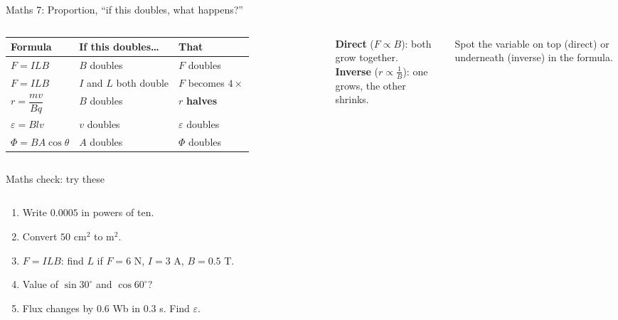 \documentclass[aspectratio=169,11pt,xcolor=table]{beamer}
\begin{document}
\begin{frame}{Maths 7: Proportion, ``if this doubles, what happens?''}
\begin{columns}[T]
\renewcommand{\arraystretch}{1.3}\small
\begin{tabular}{@{}lll@{}}
\toprule
\textbf{Formula} & \textbf{If this doubles\ldots} & \textbf{That}\\
\midrule
$F=ILB$ & $B$ doubles & $F$ doubles\\
$F=ILB$ & $I$ and $L$ both double & $F$ becomes $4\times$\\
$r=\dfrac{mv}{Bq}$ & $B$ doubles & $r$ \textbf{halves}\\
$\varepsilon=Blv$ & $v$ doubles & $\varepsilon$ doubles\\
$\Phi=BA\cos\theta$ & $A$ doubles & $\Phi$ doubles\\
\bottomrule
\end{tabular}
\begin{simple}
\textbf{Direct} ($F\propto B$): both grow together.\\
\textbf{Inverse} ($r\propto\frac{1}{B}$): one grows, the other shrinks.
\end{simple}
\begin{examtip}
Spot the variable on top (direct) or underneath (inverse) in the formula.
\end{examtip}
\end{columns}
\end{frame}
\begin{frame}{Maths check: try these}
\small
\begin{columns}[T]
\begin{think}
\begin{enumerate}
\item Write $0.0005$ in powers of ten.
\item Convert $50$ cm$^2$ to m$^2$.
\item $F=ILB$: find $L$ if $F=6$ N, $I=3$ A, $B=0.5$ T.
\item Value of $\sin30^\circ$ and $\cos60^\circ$?
\item Flux changes by $0.6$ Wb in $0.3$ s. Find $\varepsilon$.
\end{enumerate}
\end{think}
\end{columns}
\end{frame}
\end{document}
